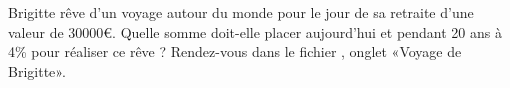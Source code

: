 
\begin{exercice}\label{exosmath-0313}

Brigitte rêve d’un voyage autour du monde pour le jour de sa retraite d’une valeur de $30 000$€. Quelle somme doit-elle placer aujourd'hui et pendant 20 ans à 4\% pour réaliser ce rêve ? Rendez-vous dans le fichier , onglet «Voyage de Brigitte». 

\end{exercice}
